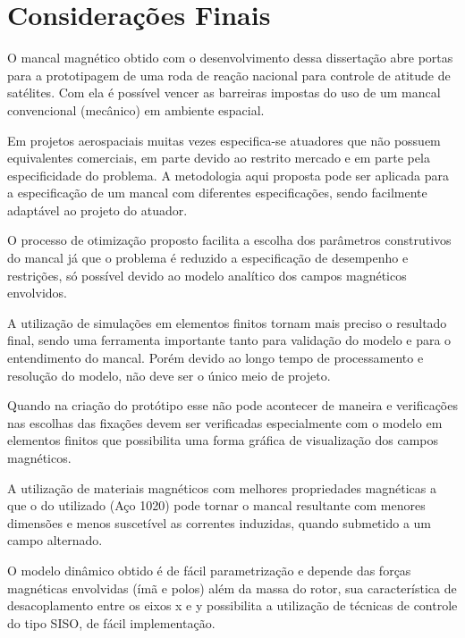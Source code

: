 \pagestyle{empty}
	\cleardoublepage
\pagestyle{fancy}

\chapter{Considerações Finais} \label{Cap:Consideracoes:Finais}


O mancal magnético obtido com o desenvolvimento dessa dissertação abre portas para a prototipagem de uma roda de reação nacional para controle de atitude de satélites. Com ela é possível vencer as barreiras impostas do uso de um mancal convencional (mecânico) em ambiente espacial.

Em projetos aerospaciais muitas vezes especifica-se atuadores que não possuem equivalentes comerciais, em parte devido ao restrito mercado e em parte pela especificidade do problema. A metodologia aqui proposta pode ser aplicada para a especificação de um mancal com diferentes especificações, sendo facilmente adaptável ao projeto do atuador.

O processo de otimização proposto facilita a escolha dos parâmetros construtivos do mancal já que o problema é reduzido a especificação de desempenho e restrições, só possível devido ao modelo analítico dos campos magnéticos envolvidos.

A utilização de simulações em elementos finitos tornam mais preciso o resultado final, sendo uma ferramenta importante tanto para validação do modelo e para o entendimento do mancal. Porém devido ao longo tempo de processamento e resolução do modelo, não deve ser o único meio de projeto.

Quando na criação do protótipo esse não pode acontecer de maneira e verificações nas escolhas das fixações devem ser verificadas especialmente com o modelo em elementos finitos que possibilita uma forma gráfica de visualização dos campos magnéticos. 

A utilização de materiais magnéticos com melhores propriedades magnéticas a que o do utilizado (Aço 1020) pode tornar o mancal resultante com menores dimensões e menos suscetível as correntes induzidas, quando submetido a um campo alternado. 

O modelo dinâmico obtido é de fácil parametrização e depende das forças magnéticas envolvidas (ímã e polos) além da massa do rotor, sua característica de desacoplamento entre os eixos x e y possibilita a utilização de técnicas de controle do tipo SISO, de fácil implementação.









